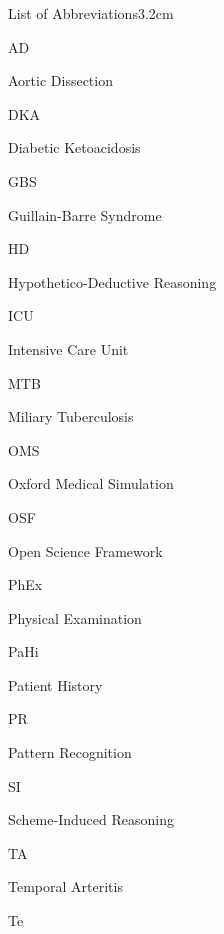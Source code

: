\documentclass[a4paper, nobind]{templates/ociamthesis}
\begin{document}
\begin{romanpages}
\listoftables
  \mtcaddchapter
\begin{mclistof}{List of Abbreviations}{3.2cm}

\item[AD]

Aortic Dissection

\item[DKA]

Diabetic Ketoacidosis

\item[GBS]

Guillain-Barre Syndrome

\item[HD]

Hypothetico-Deductive Reasoning

\item[ICU]

Intensive Care Unit

\item[MTB]

Miliary Tuberculosis

\item[OMS]

Oxford Medical Simulation

\item[OSF]

Open Science Framework

\item[PhEx]

Physical Examination

\item[PaHi]

Patient History

\item[PR]

Pattern Recognition

\item[SI]

Scheme-Induced Reasoning

\item[TA]

Temporal Arteritis

\item[Te]


\end{mclistof}
\end{romanpages}
\end{document}
